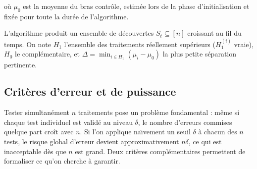 \documentclass[10.5pt,a4paper]{article}
\newcommand{\Hnull}{H_0}
\newcommand{\Halt}{H_1}
\begin{document}
\noindent o\`u $\mu_0$ est la moyenne du bras contr\^ole, estim\'ee
lors de la phase d'initialisation et fix\'ee pour toute la dur\'ee
de l'algorithme.

L'algorithme produit un ensemble de d\'ecouvertes
$S_t \subseteq [n]$ croissant au fil du temps. On note $\Halt$ l'ensemble
des traitements r\'eellement sup\'erieurs ($H_1^{(i)}$ vraie), $\Hnull$ le compl\'ementaire,
et $\Delta = \min_{i \in \Halt}(\mu_i - \mu_0)$ la plus petite s\'eparation
pertinente.

\subsection{Crit\`eres d'erreur et de puissance}

Tester simultan\'ement $n$ traitements pose un probl\`eme fondamental :
m\^eme si chaque test individuel est valid\'e au niveau $\delta$, le nombre
d'erreurs commises quelque part cro\^it avec $n$. Si l'on applique
na\"\i vement un seuil $\delta$ \`a chacun des $n$ tests, le risque global
d'erreur devient approximativement $n\delta$, ce qui est inacceptable d\`es
que $n$ est grand. Deux crit\`eres compl\'ementaires permettent de
formaliser ce qu'on cherche \`a garantir.
\end{document}
